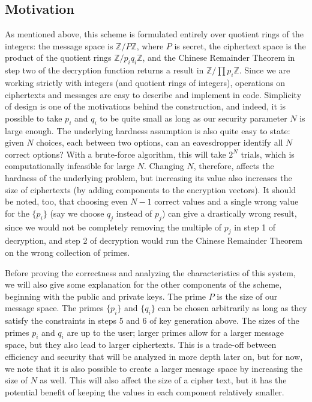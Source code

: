\documentclass[11pt]{report}
\newcommand{\Z}{\mathbb{Z}}
\newcommand{\ZP}{\mathbb{Z}/P\mathbb{Z}}
\begin{document}
\subsection{Motivation}

As mentioned above, this scheme is formulated entirely over quotient rings of the integers: the message space is $\ZP$, where $P$ is secret, the ciphertext space is the product of the quotient rings $\Z/p_iq_i\Z$, and the Chinese Remainder Theorem in step two of the decryption function returns a result in $\Z/\prod p_i\Z$. Since we are working strictly with integers (and quotient rings of integers), operations on ciphertexts and messages are easy to describe and implement in code. Simplicity of design is one of the motivations behind the construction, and indeed, it is possible to take $p_i$ and $q_i$ to be quite small as long as our security parameter $N$ is large enough. The underlying hardness assumption is also quite easy to state: given $N$ choices, each between two options, can an eavesdropper identify all $N$ correct options? With a brute-force algorithm, this will take $2^N$ trials, which is computationally infeasible for large $N$. Changing $N$, therefore, affects the hardness of the underlying problem, but increasing its value also increases the size of ciphertexts (by adding components to the encryption vectors). It should be noted, too, that choosing even $N-1$ correct values and a single wrong value for the $\{p_i\}$ (say we choose $q_j$ instead of $p_j$) can give a drastically wrong result, since we would not be completely removing the multiple of $p_j$ in step 1 of decryption, and step 2 of decryption would run the Chinese Remainder Theorem on the wrong collection of primes.

Before proving the correctness and analyzing the characteristics of this system, we will also give some explanation for the other components of the scheme, beginning with the public and private keys. The prime $P$ is the size of our message space. The primes $\{p_i\}$ and $\{q_i\}$ can be chosen arbitrarily as long as they satisfy the constraints in steps 5 and 6 of key generation above. The sizes of the primes $p_i$ and $q_i$ are up to the user; larger primes allow for a larger message space, but they also lead to larger ciphertexts. This is a trade-off between efficiency and security that will be analyzed in more depth later on, but for now, we note that it is also possible to create a larger message space by increasing the size of $N$ as well. This will also affect the size of a cipher text, but it has the potential benefit of keeping the values in each component relatively smaller.
\end{document}
